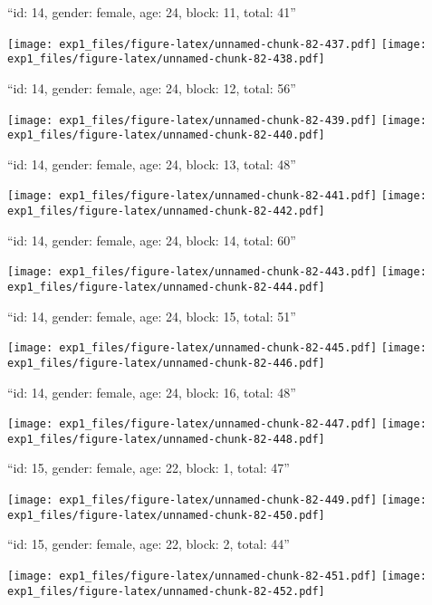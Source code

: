 \documentclass[11pt,,]{article}
\begin{document}
\newpage
[1] 

``id: 14, gender: female, age: 24, block: 11, total: 41''

\texttt{[image: exp1\_files/figure-latex/unnamed-chunk-82-437.pdf]}
\texttt{[image: exp1\_files/figure-latex/unnamed-chunk-82-438.pdf]}

\newpage
[1] 

``id: 14, gender: female, age: 24, block: 12, total: 56''

\texttt{[image: exp1\_files/figure-latex/unnamed-chunk-82-439.pdf]}
\texttt{[image: exp1\_files/figure-latex/unnamed-chunk-82-440.pdf]}

\newpage
[1] 

``id: 14, gender: female, age: 24, block: 13, total: 48''

\texttt{[image: exp1\_files/figure-latex/unnamed-chunk-82-441.pdf]}
\texttt{[image: exp1\_files/figure-latex/unnamed-chunk-82-442.pdf]}

\newpage
[1] 

``id: 14, gender: female, age: 24, block: 14, total: 60''

\texttt{[image: exp1\_files/figure-latex/unnamed-chunk-82-443.pdf]}
\texttt{[image: exp1\_files/figure-latex/unnamed-chunk-82-444.pdf]}

\newpage
[1] 

``id: 14, gender: female, age: 24, block: 15, total: 51''

\texttt{[image: exp1\_files/figure-latex/unnamed-chunk-82-445.pdf]}
\texttt{[image: exp1\_files/figure-latex/unnamed-chunk-82-446.pdf]}

\newpage
[1] 

``id: 14, gender: female, age: 24, block: 16, total: 48''

\texttt{[image: exp1\_files/figure-latex/unnamed-chunk-82-447.pdf]}
\texttt{[image: exp1\_files/figure-latex/unnamed-chunk-82-448.pdf]}

\newpage
[1] 

``id: 15, gender: female, age: 22, block: 1, total: 47''

\texttt{[image: exp1\_files/figure-latex/unnamed-chunk-82-449.pdf]}
\texttt{[image: exp1\_files/figure-latex/unnamed-chunk-82-450.pdf]}

\newpage
[1] 

``id: 15, gender: female, age: 22, block: 2, total: 44''

\texttt{[image: exp1\_files/figure-latex/unnamed-chunk-82-451.pdf]}
\texttt{[image: exp1\_files/figure-latex/unnamed-chunk-82-452.pdf]}
\end{document}
